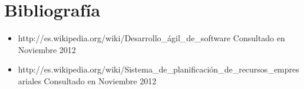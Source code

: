 \chapter*{Bibliograf\'ia}
\begin{itemize}
	\item http://es.wikipedia.org/wiki/Desarrollo\_\'agil\_de\_software Consultado en Noviembre 2012
	\item http://es.wikipedia.org/wiki/Sistema\_de\_planificaci\'on\_de\_recursos\_empresariales Consultado en Noviembre 2012
\end{itemize}